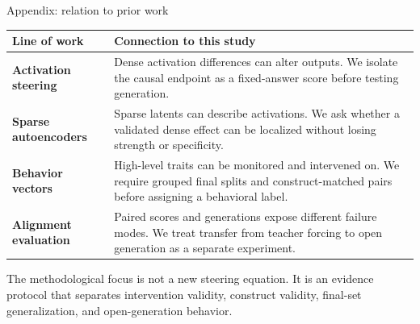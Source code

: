 \documentclass[aspectratio=169,10pt]{beamer}
\begin{document}
\begin{frame}{Appendix: relation to prior work}
\small
\begin{tabularx}{\textwidth}{>{\raggedright\arraybackslash\bfseries}p{2.75cm}X}
\toprule
Line of work & Connection to this study \\
\midrule
Activation steering & Dense activation differences can alter outputs. We isolate the causal endpoint as a fixed-answer score before testing generation. \\
\addlinespace
Sparse autoencoders & Sparse latents can describe activations. We ask whether a validated dense effect can be localized without losing strength or specificity. \\
\addlinespace
Behavior vectors & High-level traits can be monitored and intervened on. We require grouped final splits and construct-matched pairs before assigning a behavioral label. \\
\addlinespace
Alignment evaluation & Paired scores and generations expose different failure modes. We treat transfer from teacher forcing to open generation as a separate experiment. \\
\bottomrule
\end{tabularx}

\vspace{0.36cm}
The methodological focus is not a new steering equation. It is an evidence
protocol that separates intervention validity, construct validity, final-set
generalization, and open-generation behavior.
\end{frame}
\end{document}
